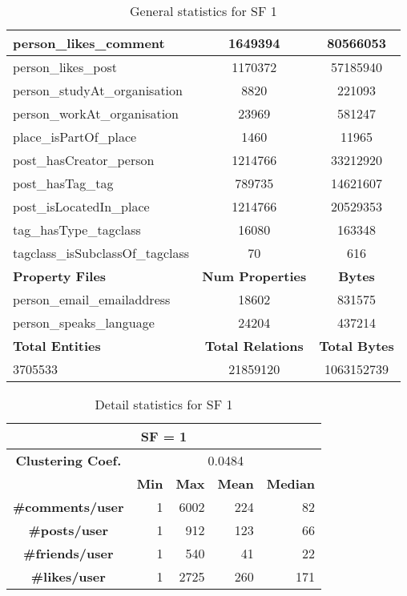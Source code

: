 \begin{table}[H]
\begin{tabular} {| l | c | c |}
        \hline
        person\_likes\_comment & 1649394 & 80566053 \\
        \hline
        person\_likes\_post & 1170372 & 57185940 \\
        \hline
        person\_studyAt\_organisation & 8820 & 221093 \\
        \hline
        person\_workAt\_organisation & 23969 & 581247 \\
        \hline
        place\_isPartOf\_place & 1460 & 11965 \\
        \hline
        post\_hasCreator\_person & 1214766 & 33212920 \\
        \hline
        post\_hasTag\_tag & 789735 & 14621607 \\
        \hline
        post\_isLocatedIn\_place & 1214766 & 20529353 \\
        \hline
        tag\_hasType\_tagclass & 16080 & 163348 \\
        \hline
        tagclass\_isSubclassOf\_tagclass & 70 & 616 \\
        \hline
        \hline
        \textbf{Property Files} & \textbf{Num Properties} & \textbf{Bytes} \\
        \hline
        \hline
        person\_email\_emailaddress & 18602 & 831575 \\
        \hline
        person\_speaks\_language & 24204 & 437214 \\
        \hline
        \hline
        \textbf{Total Entities} & \textbf{Total Relations} & \textbf{Total Bytes} \\
        \hline
        \hline
        3705533 & 21859120 & 1063152739 \\
        \hline
    \end{tabular}
    \caption{General statistics for SF 1}
\end{table}


\begin{table}[H]
        \centering
        \begin{tabular}{|c||r|r|r|r|}
            \hline    \multicolumn{5}{|c|}{SF = 1 }  \\
            \hline   \textbf{Clustering Coef.} &   \multicolumn{4}{|c|}{0.0484} \\
            \hline & \textbf{Min} & \textbf{Max} & \textbf{Mean} & \textbf{Median}   \\
            \hline  \textbf{\#comments/user}  &1 &  6002 & 224 & 82 \\
            \hline  \textbf{\#posts/user}  &1 &  912 & 123 & 66 \\
            \hline  \textbf{\#friends/user}  &1 &  540 & 41 & 22 \\
            \hline  \textbf{\#likes/user}  &1 &  2725 & 260 & 171 \\
            \hline
        \end{tabular}
        \caption{Detail statistics for SF 1}
\end{table}

